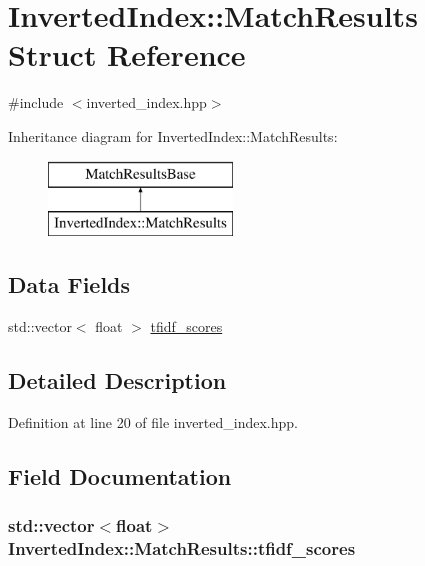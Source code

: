\hypertarget{structInvertedIndex_1_1MatchResults}{\section{Inverted\-Index\-:\-:Match\-Results Struct Reference}
\label{structInvertedIndex_1_1MatchResults}
}


{\ttfamily \#include $<$inverted\-\_\-index.\-hpp$>$}

Inheritance diagram for Inverted\-Index\-:\-:Match\-Results\-:\begin{figure}[H]
\begin{center}
\leavevmode
\includegraphics[height=2.000000cm]{structInvertedIndex_1_1MatchResults}
\end{center}
\end{figure}
\subsection*{Data Fields}
\begin{DoxyCompactItemize}
\item 
std\-::vector$<$ float $>$ \hyperlink{structInvertedIndex_1_1MatchResults_a8acc0fd9cd82f3c0a794f63de97a75d3}{tfidf\-\_\-scores}
\end{DoxyCompactItemize}


\subsection{Detailed Description}


Definition at line 20 of file inverted\-\_\-index.\-hpp.



\subsection{Field Documentation}
\hypertarget{structInvertedIndex_1_1MatchResults_a8acc0fd9cd82f3c0a794f63de97a75d3}{
\subsubsection[{tfidf\-\_\-scores}]{\setlength{\rightskip}{0pt plus 5cm}std\-::vector$<$float$>$ Inverted\-Index\-::\-Match\-Results\-::tfidf\-\_\-scores}}\label{structInvertedIndex_1_1MatchResults_a8acc0fd9cd82f3c0a794f63de97a75d3}


